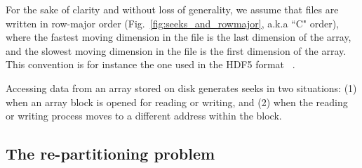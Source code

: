 \documentclass[sigconf, nonacm]{acmart}
\begin{document}
For the sake of clarity and without loss of generality, we assume that
 files are written in row-major order (Fig.~\ref{fig:seeks_and_rowmajor},
 a.k.a ``C" order), where the fastest moving dimension in the file is the
 last dimension of the array, and the slowest moving dimension in the file
 is the first dimension of the array. This convention is for instance the
 one used in the HDF5 format ~\cite{hdf5}.

Accessing data from an array stored on disk generates seeks in two
situations: (1) when an array block is opened for reading or writing, and
(2) when the reading or writing process moves to a different address within
the block.

\subsection{The re-partitioning problem}
\end{document}
